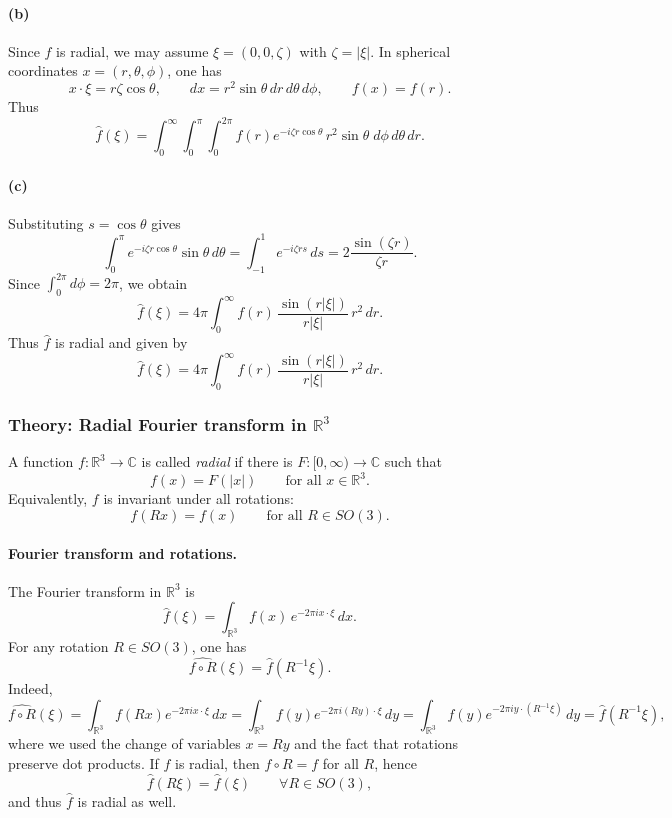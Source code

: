 \documentclass[12pt,a4paper]{article}
\theoremstyle{plain}
\theoremstyle{definition}
\theoremstyle{remark}
\theoremstyle{remark}
\begin{document}
\paragraph{(b)}
Since $\widehat{f}$ is radial, we may assume $\xi=(0,0,\zeta)$ with
$\zeta=|\xi|$. In spherical coordinates
$x=(r,\theta,\phi)$, one has
\[
x\cdot\xi=r\zeta\cos\theta,
\qquad
dx=r^{2}\sin\theta\,dr\,d\theta\,d\phi,
\qquad
f(x)=f(r).
\]
Thus
\[
\widehat{f}(\xi)
=\int_{0}^{\infty}\int_{0}^{\pi}\int_{0}^{2\pi}
f(r)e^{-i\zeta r\cos\theta}\,
r^{2}\sin\theta\;d\phi\,d\theta\,dr.
\]

\paragraph{(c)}
Substituting $s=\cos\theta$ gives
\[
\int_{0}^{\pi} e^{-i\zeta r\cos\theta}\sin\theta\,d\theta
=\int_{-1}^{1} e^{-i\zeta r s}\,ds
=2\frac{\sin(\zeta r)}{\zeta r}.
\]
Since $\int_{0}^{2\pi} d\phi = 2\pi$, we obtain
\[
\widehat{f}(\xi)
=4\pi \int_{0}^{\infty}
f(r)\,\frac{\sin(r|\xi|)}{r|\xi|}\,r^{2}\,dr.
\]
Thus $\widehat{f}$ is radial and given by
\[
\boxed{
	\widehat{f}(\xi)
	=4\pi\int_{0}^{\infty} f(r)\,\frac{\sin(r|\xi|)}{r|\xi|}\,r^{2}\,dr.
}
\]


\subsubsection*{Theory: Radial Fourier transform in $\mathbb{R}^3$}

A function $f:\mathbb{R}^{3}\to\mathbb{C}$ is called \emph{radial} if
there is $F:[0,\infty)\to\mathbb{C}$ such that
\[
f(x) = F(|x|)\qquad\text{for all }x\in\mathbb{R}^{3}.
\]
Equivalently, $f$ is invariant under all rotations:
\[
f(Rx) = f(x)\qquad\text{for all }R\in SO(3).
\]

\paragraph{Fourier transform and rotations.}
The Fourier transform in $\mathbb{R}^{3}$ is
\[
\widehat{f}(\xi)
= \int_{\mathbb{R}^{3}} f(x)\,e^{-2\pi i x\cdot\xi}\,dx.
\]
For any rotation $R\in SO(3)$, one has
\[
\widehat{f\circ R}(\xi)
= \widehat{f}(R^{-1}\xi).
\]
Indeed,
\[
\widehat{f\circ R}(\xi)
= \int_{\mathbb{R}^{3}} f(Rx)e^{-2\pi i x\cdot\xi}\,dx
= \int_{\mathbb{R}^{3}} f(y)e^{-2\pi i (Ry)\cdot\xi}\,dy
= \int_{\mathbb{R}^{3}} f(y)e^{-2\pi i y\cdot (R^{-1}\xi)}\,dy
= \widehat{f}(R^{-1}\xi),
\]
where we used the change of variables $x=Ry$ and the fact that rotations
preserve dot products. If $f$ is radial, then $f\circ R=f$ for all $R$, hence
\[
\widehat{f}(R\xi) = \widehat{f}(\xi)\qquad\forall R\in SO(3),
\]
and thus $\widehat{f}$ is radial as well.
\end{document}
